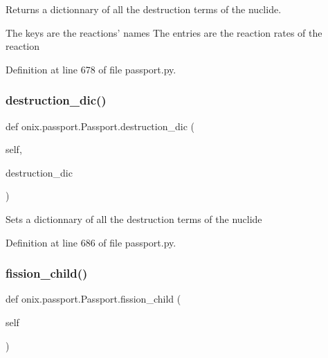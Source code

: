 \begin{DoxyVerb}Returns a dictionnary of all the destruction terms of the nuclide.

The keys are the reactions' names
The entries are the reaction rates of the reaction\end{DoxyVerb}
 

Definition at line 678 of file passport.\+py.

\mbox{\label{classonix_1_1passport_1_1Passport_a1bde7187f237c80ba5253fb839d5e485}} 
\subsubsection{\texorpdfstring{destruction\+\_\+dic()}{destruction\_dic()}\hspace{0.1cm}{\footnotesize\ttfamily [2/2]}}
{\footnotesize\ttfamily def onix.\+passport.\+Passport.\+destruction\+\_\+dic (\begin{DoxyParamCaption}\item[{}]{self,  }\item[{}]{destruction\+\_\+dic }\end{DoxyParamCaption})}

\begin{DoxyVerb}Sets a dictionnary of all the destruction terms of the nuclide\end{DoxyVerb}
 

Definition at line 686 of file passport.\+py.

\mbox{\label{classonix_1_1passport_1_1Passport_aa073caafcac43de54811fd7d18bb0089}} 
\subsubsection{\texorpdfstring{fission\+\_\+child()}{fission\_child()}}
{\footnotesize\ttfamily def onix.\+passport.\+Passport.\+fission\+\_\+child (\begin{DoxyParamCaption}\item[{}]{self }\end{DoxyParamCaption})}

